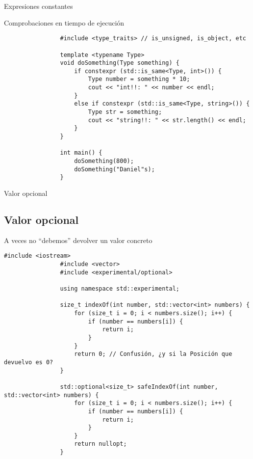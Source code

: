 \documentclass{beamer}
\newcommand{\normalSizeItem}[1] {
  \normalsize{\item #1}
}
\begin{document}
		\begin{frame}[fragile]{Expresiones constantes }	
			\begin{itemize}
				\normalSizeItem { Comprobaciones en tiempo de ejecución }
				\begin{lstlisting}
				#include <type_traits> // is_unsigned, is_object, etc
				
				template <typename Type>
				void doSomething(Type something) {	
					if constexpr (std::is_same<Type, int>()) {
						Type number = something * 10;
						cout << "int!!: " << number << endl;
					}
					else if constexpr (std::is_same<Type, string>()) {
						Type str = something;
						cout << "string!!: " << str.length() << endl;
					}
				}
	
				int main() {
					doSomething(800);
					doSomething("Daniel"s);
				}
				\end{lstlisting}
			\end{itemize}
		\end{frame}
		
		\begin{frame}[fragile]{Valor opcional}	
			\subsection{Valor opcional}
			\begin{itemize}
				\normalSizeItem { A veces no ``debemos'' devolver un valor concreto }
				\begin{lstlisting}[basicstyle={\tiny\ttfamily}]
				#include <iostream>
				#include <vector>
				#include <experimental/optional>
				
				using namespace std::experimental;
				
				size_t indexOf(int number, std::vector<int> numbers) {
					for (size_t i = 0; i < numbers.size(); i++) {
						if (number == numbers[i]) { 
							return i; 	
						}
					}
					return 0; // Confusión, ¿y si la Posición que devuelvo es 0? 
				}
				
				std::optional<size_t> safeIndexOf(int number, std::vector<int> numbers) {
					for (size_t i = 0; i < numbers.size(); i++) {
						if (number == numbers[i]) {
							return i;
						}
					}
					return nullopt;
				}
				\end{lstlisting}
			\end{itemize}
		\end{frame}
		
\end{document}
